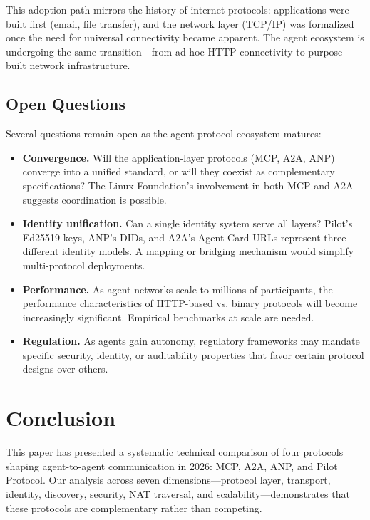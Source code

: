 \documentclass[11pt,a4paper]{article}
\begin{document}
This adoption path mirrors the history of internet protocols: applications were built first (email, file transfer), and the network layer (TCP/IP) was formalized once the need for universal connectivity became apparent. The agent ecosystem is undergoing the same transition---from ad hoc HTTP connectivity to purpose-built network infrastructure.

\subsection{Open Questions}

Several questions remain open as the agent protocol ecosystem matures:

\begin{itemize}
    \item \textbf{Convergence.} Will the application-layer protocols (MCP, A2A, ANP) converge into a unified standard, or will they coexist as complementary specifications? The Linux Foundation's involvement in both MCP and A2A suggests coordination is possible.
    \item \textbf{Identity unification.} Can a single identity system serve all layers? Pilot's Ed25519 keys, ANP's DIDs, and A2A's Agent Card URLs represent three different identity models. A mapping or bridging mechanism would simplify multi-protocol deployments.
    \item \textbf{Performance.} As agent networks scale to millions of participants, the performance characteristics of HTTP-based vs. binary protocols will become increasingly significant. Empirical benchmarks at scale are needed.
    \item \textbf{Regulation.} As agents gain autonomy, regulatory frameworks may mandate specific security, identity, or auditability properties that favor certain protocol designs over others.
\end{itemize}

\section{Conclusion}

This paper has presented a systematic technical comparison of four protocols shaping agent-to-agent communication in 2026: MCP, A2A, ANP, and Pilot Protocol. Our analysis across seven dimensions---protocol layer, transport, identity, discovery, security, NAT traversal, and scalability---demonstrates that these protocols are complementary rather than competing.
\end{document}
